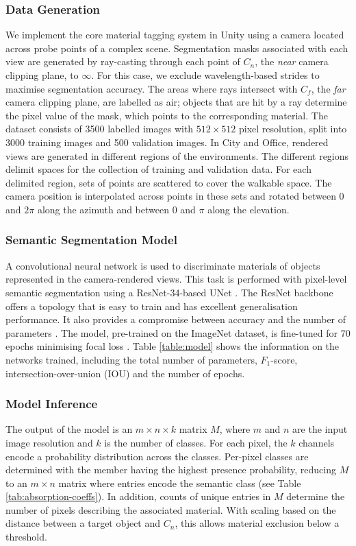 \subsubsection{Data Generation}
We implement the core material tagging system in Unity using a camera located across probe points of a complex scene. Segmentation masks associated with each view are generated by ray-casting through each point of $C_n$, the \emph{near} camera clipping plane, to $\infty$. For this case, we exclude wavelength-based strides to maximise segmentation accuracy. The areas where rays intersect with $C_f$, the \emph{far} camera clipping plane, are labelled as air; objects that are hit by a ray determine the pixel value of the mask, which points to the corresponding material. The dataset consists of 3500 labelled images with $512\times512$ pixel resolution, split into 3000 training images and 500 validation images. 
In City and Office, rendered views are generated in different regions of the environments. The different regions delimit spaces for the collection of training and validation data. For each delimited region, sets of points are scattered to cover the walkable space. The camera position is interpolated across points in these sets and rotated between 0 and $2\pi$ along the azimuth and between 0 and $\pi$ along the elevation.

\subsubsection{Semantic Segmentation Model}
A convolutional neural network is used to discriminate materials of objects represented in the camera-rendered views. This task is performed with pixel-level semantic segmentation using a ResNet-34-based UNet \cite{ronneberger2015u}. The ResNet backbone offers a topology that is easy to train and has excellent generalisation performance. It also provides a compromise between accuracy and the number of parameters \cite{he2016deep}.
The model, pre-trained on the ImageNet dataset, is fine-tuned for 70 epochs minimising focal loss \cite{lin2017focal}. Table \ref{table:model} shows the information on the networks trained, including the total number of parameters, $F_{1}$\hyp{}score, intersection-over-union (IOU) and the number of epochs.


\subsubsection{Model Inference}
The output of the model is an $m \times n \times k$ matrix $M$, where $m$ and $n$ are the input image resolution and $k$ is the number of classes. For each pixel, the $k$ channels encode a probability distribution across the classes. Per-pixel classes are determined with the member having the highest presence probability, reducing $M$ to an $m \times n$ matrix where entries encode the semantic class (see Table \ref{tab:absorption-coeffs}). 
In addition, counts of unique entries in $M$ determine the number of pixels describing the associated material. With scaling based on the distance between a target object and $C_n$, this allows material exclusion below a threshold.

